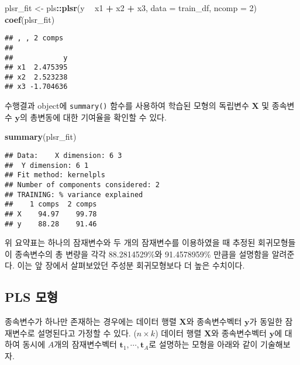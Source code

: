 \documentclass[]{book}
\newenvironment{Shaded}{\begin{snugshade}}{\end{snugshade}}
\newcommand{\DataTypeTok}[1]{\textcolor[rgb]{0.13,0.29,0.53}{#1}}
\newcommand{\DecValTok}[1]{\textcolor[rgb]{0.00,0.00,0.81}{#1}}
\newcommand{\KeywordTok}[1]{\textcolor[rgb]{0.13,0.29,0.53}{\textbf{#1}}}
\newcommand{\NormalTok}[1]{#1}
\newcommand{\OperatorTok}[1]{\textcolor[rgb]{0.81,0.36,0.00}{\textbf{#1}}}
\newcommand{\StringTok}[1]{\textcolor[rgb]{0.31,0.60,0.02}{#1}}
\begin{document}
\begin{Shaded}
\begin{Highlighting}[]
\NormalTok{plsr_fit <-}\StringTok{ }\NormalTok{pls}\OperatorTok{::}\KeywordTok{plsr}\NormalTok{(y }\OperatorTok{~}\StringTok{ }\NormalTok{x1 }\OperatorTok{+}\StringTok{ }\NormalTok{x2 }\OperatorTok{+}\StringTok{ }\NormalTok{x3, }\DataTypeTok{data =}\NormalTok{ train_df, }\DataTypeTok{ncomp =} \DecValTok{2}\NormalTok{)}
\KeywordTok{coef}\NormalTok{(plsr_fit)}
\end{Highlighting}
\end{Shaded}

\begin{verbatim}
## , , 2 comps
## 
##            y
## x1  2.475395
## x2  2.523238
## x3 -1.704636
\end{verbatim}

수행결과 object에 \texttt{summary()} 함수를 사용하여 학습된 모형의 독립변수 \(\mathbf{X}\) 및 종속변수 \(\mathbf{y}\)의 총변동에 대한 기여율을 확인할 수 있다.

\begin{Shaded}
\begin{Highlighting}[]
\KeywordTok{summary}\NormalTok{(plsr_fit)}
\end{Highlighting}
\end{Shaded}

\begin{verbatim}
## Data:    X dimension: 6 3 
##  Y dimension: 6 1
## Fit method: kernelpls
## Number of components considered: 2
## TRAINING: % variance explained
##    1 comps  2 comps
## X    94.97    99.78
## y    88.28    91.46
\end{verbatim}

위 요약표는 하나의 잠재변수와 두 개의 잠재변수를 이용하였을 때 추정된 회귀모형들이 종속변수의 총 변량을 각각 88.2814529\%와 91.4578959\% 만큼을 설명함을 알려준다. 이는 앞 장에서 살펴보았던 주성분 회귀모형보다 더 높은 수치이다.

\hypertarget{plsr-model}{%
\subsection{PLS 모형}\label{plsr-model}}

종속변수가 하나만 존재하는 경우에는 데이터 행렬 \(\mathbf{X}\)와 종속변수벡터 \(\mathbf{y}\)가 동일한 잠재변수로 설명된다고 가정할 수 있다. (\(n \times k\)) 데이터 행렬 \(\mathbf{X}\)와 종속변수벡터 \(\mathbf{y}\)에 대하여 동시에 \(A\)개의 잠재변수벡터 \(\mathbf{t}_1, \cdots, \mathbf{t}_A\)로 설명하는 모형을 아래와 같이 기술해보자.
\end{document}
